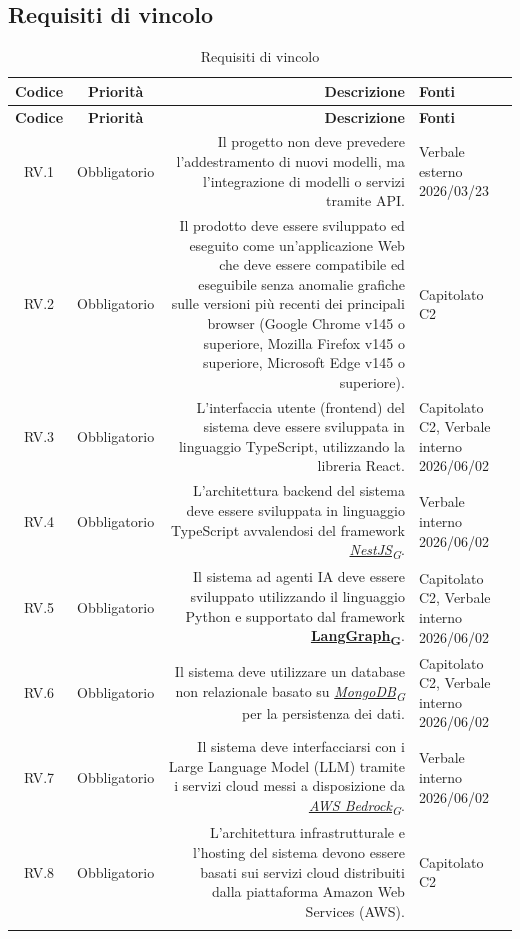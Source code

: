 \documentclass[12pt, a4paper]{article}
\newcommand{\urlglossario}{https://skynetunigroup.github.io/Code_Guardian/Documentazione/PB/glossario_v2.0.0.pdf} %
\newcommand{\glo}[2]{\href{\urlglossario\#nameddest=#2}{#1\textsubscript{G}}}
\begin{document}
\newpage
\subsection{Requisiti di vincolo}

\begingroup
\renewcommand{\arraystretch}{1.3}

\begin{xltabular}{\textwidth}{|c|c|D|F|}

    \hline
    \textbf{Codice} & \textbf{Priorità} & \textbf{Descrizione} & \textbf{Fonti} \\ 
    \hline
    \endfirsthead

    \hline
    \textbf{Codice} & \textbf{Priorità} & \textbf{Descrizione} & \textbf{Fonti} \\ 
    \hline
    \endhead

    RV.1 & Obbligatorio & Il progetto non deve prevedere l’addestramento di nuovi modelli, ma l’integrazione di modelli o servizi tramite API. & Verbale esterno 2026/03/23 \\
    \hline
    RV.2 & Obbligatorio & Il prodotto deve essere sviluppato ed eseguito come un'applicazione Web che deve essere compatibile ed eseguibile senza anomalie grafiche sulle versioni più recenti dei principali browser (Google Chrome v145 o superiore, Mozilla Firefox v145 o superiore, Microsoft Edge v145 o superiore). & Capitolato C2 \\
    \hline
    RV.3 & Obbligatorio & L'interfaccia utente (frontend) del sistema deve essere sviluppata in linguaggio TypeScript, utilizzando la libreria React. &  Capitolato C2, Verbale interno 2026/06/02 \\
    \hline
    RV.4 & Obbligatorio & L'architettura backend del sistema deve essere sviluppata in linguaggio TypeScript avvalendosi del framework \textit{\glo{NestJS}{nestjs}}. &  Verbale interno 2026/06/02 \\
    \hline
    RV.5 & Obbligatorio & Il sistema ad agenti IA deve essere sviluppato utilizzando il linguaggio Python e supportato dal framework \textbf{\glo{LangGraph}{langgraph}}. &  Capitolato C2, Verbale interno 2026/06/02 \\
    \hline
    RV.6 & Obbligatorio & Il sistema deve utilizzare un database non relazionale basato su \textit{\glo{MongoDB}{mongodb}} per la persistenza dei dati. &  Capitolato C2, Verbale interno 2026/06/02 \\
    \hline
    RV.7 & Obbligatorio & Il sistema deve interfacciarsi con i Large Language Model (LLM) tramite i servizi cloud messi a disposizione da \textit{\glo{AWS Bedrock}{aws-bedrock}}. &  Verbale interno 2026/06/02 \\
    \hline
    RV.8 & Obbligatorio & L'architettura infrastrutturale e l'hosting del sistema devono essere basati sui servizi cloud distribuiti dalla piattaforma Amazon Web Services (AWS). &  Capitolato C2 \\
    \hline

    \caption{Requisiti di vincolo}
    \label{tab:rv}
    
\end{xltabular}
\endgroup
\newpage
\end{document}

